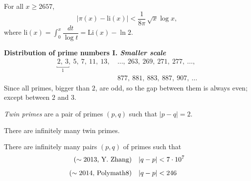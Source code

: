 
\begin{conjecture}
For all $x \geq 2657$,
\[|\pi(x) - \mathrm{li}(x)| < \frac{1}{8\pi}\,\sqrt{x}\log x,\]
where $\displaystyle \mathrm{li}(x) = \int_0^x \dfrac{dt}{\log t} = \mathrm{Li}(x) - \ln 2$.
\end{conjecture}

\vspace*{3em}

{\bf\large Distribution of prime numbers I. \emph{Smaller scale}}
\vspace*{0.5em}
\begin{align*}
\underbracket{2,\ 3}_1,\ 5,\ 7,\ 11,\ 13,\ &\ldots,\ 263,\ 269,\ 271,\ 277,\ \ldots,\\[0.5em]
& 877,\ 881,\ 883,\ 887,\ 907,\ \ldots
\end{align*}
Since all primes, bigger than $2$, are odd, so the gap between them is always even; except between $2$ and $3$.

\vspace*{2em}
 
\begin{definition}
\emph{Twin primes} are a pair of primes $(p,q)$ such that $|p-q| = 2$.
\end{definition}

\vspace*{1em}

\begin{conjecture}
There are infinitely many twin primes.
\end{conjecture}

\vspace*{1em}

\begin{theorem}
There are infinitely many pairs $(p,q)$ of primes such that 
\begin{align*}
\textnormal{($\sim 2013$, Y. Zhang)}\quad & |q-p| < 7\cdot 10^7\\[0.5em]
\textnormal{($\sim 2014$, Polymath8)}\quad & |q-p| < 246
\end{align*}
\end{theorem}

\vspace*{2em}

